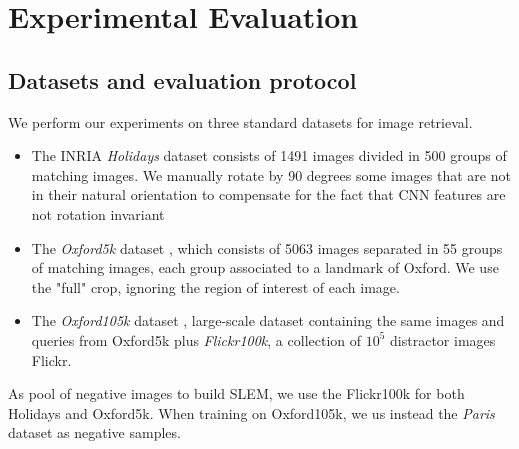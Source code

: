\section{Experimental Evaluation}
\label{eval}


\subsection{Datasets and evaluation protocol} \label{eval:protocol}
We perform our experiments on three standard datasets for image retrieval. 
\begin{itemize}
    \item The INRIA \emph{Holidays} dataset \cite{holidays} consists of 1491 images divided in 500 groups of matching images. We manually rotate by 90 degrees some images that are not in their natural orientation to compensate for the fact that CNN features are not rotation invariant~\cite{babenko14,Arandjelovic15,RaToCh16}
    \item The \emph{Oxford5k} dataset \cite{oxford}, which consists of 5063 images separated in 55 groups of matching images, each group associated to a landmark of Oxford. We use the "full" crop, ignoring the region of interest of each image.
    \item The \emph{Oxford105k} dataset \cite{oxford}, large-scale dataset containing the same images and queries from Oxford5k plus \emph{Flickr100k}, a collection of $10^5$ distractor images Flickr.
\end{itemize}
As pool of negative images to build SLEM, we use the Flickr100k for both Holidays and Oxford5k. When training on Oxford105k, we us instead the \emph{Paris} dataset \cite{PhiChIsSiZi08} as negative samples.

